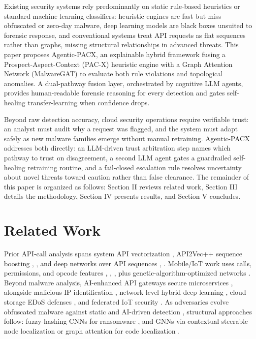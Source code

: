 \documentclass[conference]{IEEEtran}
\begin{document}
Existing security systems rely predominantly on static rule-based heuristics or standard machine learning classifiers: heuristic engines are fast but miss obfuscated or zero-day malware, deep learning models are black boxes unsuited to forensic response, and conventional systems treat API requests as flat sequences rather than graphs, missing structural relationships in advanced threats. This paper proposes Agentic-PACX, an explainable hybrid framework fusing a Prospect-Aspect-Context (PAC-X) heuristic engine with a Graph Attention Network (MalwareGAT) to evaluate both rule violations and topological anomalies. A dual-pathway fusion layer, orchestrated by cognitive LLM agents, provides human-readable forensic reasoning for every detection and gates self-healing transfer-learning when confidence drops.

Beyond raw detection accuracy, cloud security operations require verifiable trust: an analyst must audit why a request was flagged, and the system must adapt safely as new malware families emerge without manual retraining. Agentic-PACX addresses both directly: an LLM-driven trust arbitration step names which pathway to trust on disagreement, a second LLM agent gates a guardrailed self-healing retraining routine, and a fail-closed escalation rule resolves uncertainty about novel threats toward caution rather than false clearance. The remainder of this paper is organized as follows: Section II reviews related work, Section III details the methodology, Section IV presents results, and Section V concludes.

\section{Related Work}
Prior API-call analysis spans system API vectorization \cite{b6}, API2Vec++ sequence boosting \cite{b15}, \cite{b16}, and deep networks over API sequences \cite{b18}, \cite{b17}. Mobile/IoT work uses calls, permissions, and opcode features \cite{b8}, \cite{b10}, \cite{b11}, plus genetic-algorithm-optimized networks \cite{b13}. Beyond malware analysis, AI-enhanced API gateways secure microservices \cite{b5}, alongside malicious-IP identification \cite{b4}, network-level hybrid deep learning \cite{b1}, cloud-storage EDoS defenses \cite{b3}, and federated IoT security \cite{b9}. As adversaries evolve obfuscated malware against static and AI-driven detection \cite{b7}, structural approaches follow: fuzzy-hashing CNNs for ransomware \cite{b12}, and GNNs via contextual steerable node localization \cite{b2} or graph attention for code localization \cite{b14}.
\end{document}
